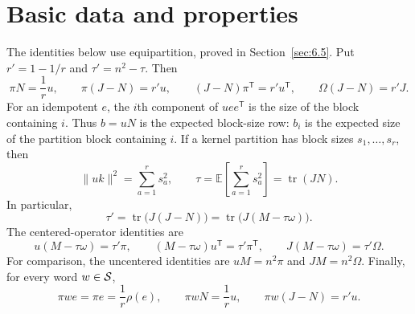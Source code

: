 
\section{Basic data and properties}
\label{sec:6.4}
The identities below use equipartition, proved in Section~\ref{sec:6.5}.
Put $r'=1-1/r$ and $\tau'=n^2-\tau$. Then
\[
 \pi N=\frac1r u,\qquad \pi(J-N)=r'u,\qquad
 (J-N)\pi^{\mathsf T}=r'u^{\mathsf T},\qquad
 \Omega(J-N)=r'J.
\]
For an idempotent $e$, the $i$th component of $uee^{\mathsf T}$ is the
size of the block containing $i$. Thus $b=uN$ is the expected block-size
row: $b_i$ is the expected size of the partition block containing $i$.
If a kernel partition has block sizes $s_1,\ldots,s_r$, then
\[
 \|uk\|^2=\sum_{a=1}^r s_a^2,\qquad
 \tau=\mathbb E\!\left[\sum_{a=1}^r s_a^2\right]
      =\operatorname{tr}(JN).
\]
In particular,
\[
 \tau'=\operatorname{tr}\bigl(J(J-N)\bigr)
       =\operatorname{tr}\bigl(J(M-\tau\omega)\bigr).
\]
The centered-operator identities are
\[
 u(M-\tau\omega)=\tau'\pi,\qquad
 (M-\tau\omega)u^{\mathsf T}=\tau'\pi^{\mathsf T},\qquad
 J(M-\tau\omega)=\tau'\Omega.
\]
For comparison, the uncentered identities are $uM=n^2\pi$ and
$JM=n^2\Omega$. Finally, for every word $w\in{\mathcal S}$,
\[
 \pi we=\pi e=\frac1r\rho(e),\qquad
 \pi wN=\frac1r u,\qquad \pi w(J-N)=r'u.
\]
